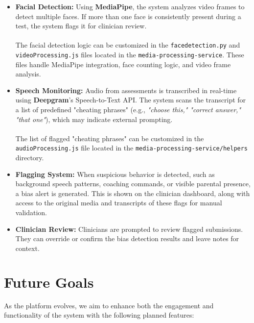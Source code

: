 \documentclass{article}
\begin{document}
\begin{itemize}
    \item \textbf{Facial Detection:} Using \textbf{MediaPipe}, the system analyzes video frames to detect multiple faces. If more than one face is consistently present during a test, the system flags it for clinician review. \\\\
    The facial detection logic can be customized in the \texttt{facedetection.py} and \texttt{videoProcessing.js} files located in the \texttt{media-processing-service}. These files handle MediaPipe integration, face counting logic, and video frame analysis.

    \item \textbf{Speech Monitoring:} Audio from assessments is transcribed in real-time using \textbf{Deepgram}'s Speech-to-Text API. The system scans the transcript for a list of predefined "cheating phrases" 
    (e.g., \textit{"choose this," "correct answer," "that one"}), which may indicate external prompting. \\\\
    The list of flagged "cheating phrases" can be customized in the \texttt{audioProcessing.js} file located in the \texttt{media-processing-service/helpers} directory.

    \item \textbf{Flagging System:} When suspicious behavior is detected, such as background speech patterns, coaching commands, or visible parental presence, a bias alert is generated. This is shown on the clinician dashboard, along with access to the original media 
    and transcripts of these flags for manual validation.

    \item \textbf{Clinician Review:} Clinicians are prompted to review flagged submissions. They can override or confirm the bias detection results and leave notes for context.
\end{itemize}

\section{Future Goals}
As the platform evolves, we aim to enhance both the engagement and functionality of the system with the following planned features:
\end{document}
